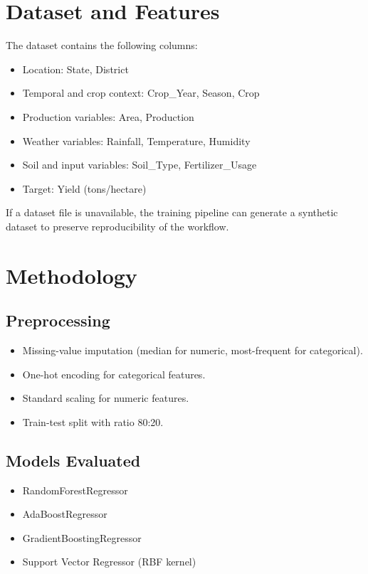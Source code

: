 \documentclass[conference]{IEEEtran}
\begin{document}
\section{Dataset and Features}
The dataset contains the following columns:
\begin{itemize}
    \item Location: State, District
    \item Temporal and crop context: Crop\_Year, Season, Crop
    \item Production variables: Area, Production
    \item Weather variables: Rainfall, Temperature, Humidity
    \item Soil and input variables: Soil\_Type, Fertilizer\_Usage
    \item Target: Yield (tons/hectare)
\end{itemize}

If a dataset file is unavailable, the training pipeline can generate a synthetic dataset to preserve reproducibility of the workflow.

\section{Methodology}
\subsection{Preprocessing}
\begin{itemize}
    \item Missing-value imputation (median for numeric, most-frequent for categorical).
    \item One-hot encoding for categorical features.
    \item Standard scaling for numeric features.
    \item Train-test split with ratio 80:20.
\end{itemize}

\subsection{Models Evaluated}
\begin{itemize}
    \item RandomForestRegressor
    \item AdaBoostRegressor
    \item GradientBoostingRegressor
    \item Support Vector Regressor (RBF kernel)
\end{itemize}
\end{document}
